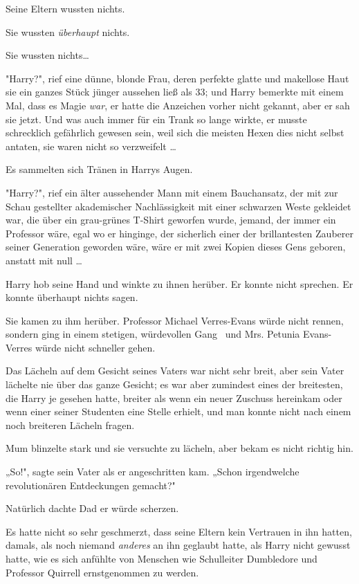 {Seine Eltern wussten nichts.

Sie wussten \emph{überhaupt} nichts.

Sie wussten nichts…

"Harry?", rief eine dünne, blonde Frau, deren perfekte glatte und makellose Haut sie ein ganzes Stück jünger aussehen ließ als 33; und Harry bemerkte mit einem Mal, dass es Magie \emph{war}, er hatte die Anzeichen vorher nicht gekannt, aber er sah sie jetzt. Und was auch immer für ein Trank so lange wirkte, er musste schrecklich gefährlich gewesen sein, weil sich die meisten Hexen dies nicht selbst antaten, sie waren nicht so verzweifelt …

Es sammelten sich Tränen in Harrys Augen.

"Harry?", rief ein älter aussehender Mann mit einem Bauchansatz, der mit zur Schau gestellter akademischer Nachlässigkeit mit einer schwarzen Weste gekleidet war, die über ein grau-grünes T-Shirt geworfen wurde, jemand, der immer ein Professor wäre, egal wo er hinginge, der sicherlich einer der brillantesten Zauberer seiner Generation geworden wäre, wäre er mit zwei Kopien dieses Gens geboren, anstatt mit null …

Harry hob seine Hand und winkte zu ihnen herüber. Er konnte nicht sprechen. Er konnte überhaupt nichts sagen.

Sie kamen zu ihm herüber. Professor Michael Verres-Evans würde nicht rennen, sondern ging in einem stetigen, würdevollen Gang ~und Mrs. Petunia Evans-Verres würde nicht schneller gehen.

Das Lächeln auf dem Gesicht seines Vaters war nicht sehr breit, aber sein Vater lächelte nie über das ganze Gesicht; es war aber zumindest eines der breitesten, die Harry je gesehen hatte, breiter als wenn ein neuer Zuschuss hereinkam oder wenn einer seiner Studenten eine Stelle erhielt, und man konnte nicht nach einem noch breiteren Lächeln fragen.

Mum blinzelte stark und sie versuchte zu lächeln, aber bekam es nicht richtig hin.

„So!", sagte sein Vater als er angeschritten kam. „Schon irgendwelche revolutionären Entdeckungen gemacht?"

Natürlich dachte Dad er würde scherzen.

Es hatte nicht so sehr geschmerzt, dass seine Eltern kein Vertrauen in ihn hatten, damals, als noch niemand \emph{anderes} an ihn geglaubt hatte, als Harry nicht gewusst hatte, wie es sich anfühlte von Menschen wie Schulleiter Dumbledore und Professor Quirrell ernstgenommen zu werden.

}
